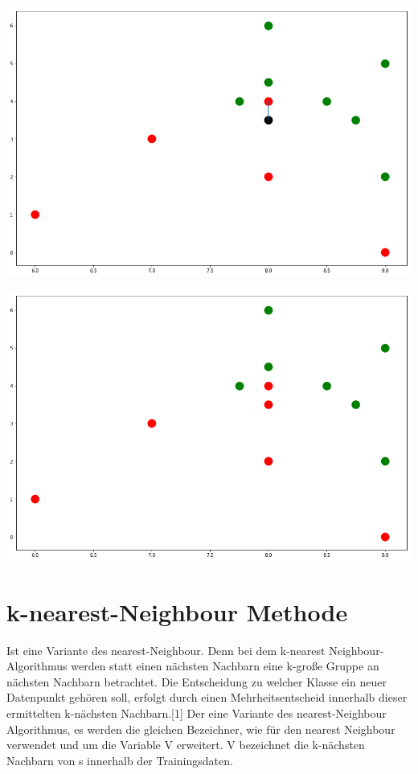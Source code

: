 \documentclass[a4paper]{scrartcl}
\begin{document}
\begin{multicols}{2}
                \includegraphics[width=\linewidth]{errnn2.png}
                            
                \includegraphics[width=\linewidth]{errnn3.png}
                         
        \section{k-nearest-Neighbour Methode}
            Ist eine Variante des nearest-Neighbour. Denn bei dem k-nearest Neighbour-Algorithmus werden statt einen nächsten Nachbarn eine k-große Gruppe an nächsten Nachbarn betrachtet. Die Entscheidung zu welcher Klasse ein neuer Datenpunkt gehören soll, erfolgt durch einen Mehrheitsentscheid innerhalb dieser ermittelten k-nächsten Nachbarn.[1]
            Der eine Variante des nearest-Neighbour Algorithmus, es werden die gleichen Bezeichner, wie für den nearest Neighbour verwendet und um die Variable V erweitert. V bezeichnet die k-nächsten Nachbarn von s innerhalb der Trainingsdaten.
        

\end{multicols}
\end{document}
